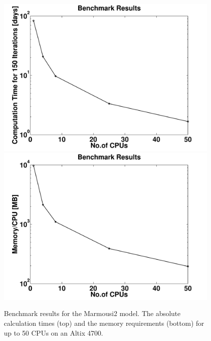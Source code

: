 \begin{figure}
\centering
\includegraphics[width=11cm]{figures/marmousi/cpu_altix_DENISE.pdf}\\
\includegraphics[width=11cm]{figures/marmousi/mem_altix_DENISE.pdf}
\caption{Benchmark results for the Marmousi2 model. The absolute calculation times (top) and the memory requirements (bottom) for up to 50 CPUs on an Altix 4700.}
\label{bench_time}
\end{figure}
\clearpage